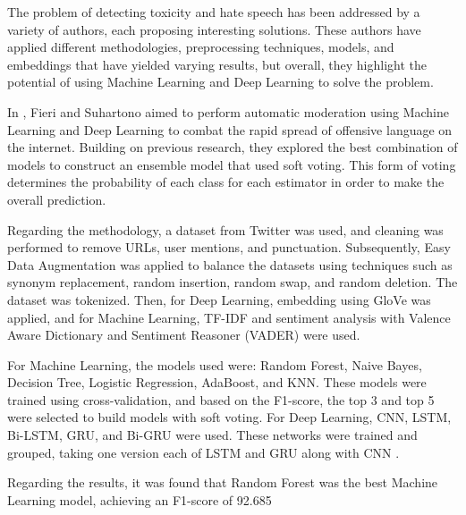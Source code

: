 
The problem of detecting toxicity and hate speech has been addressed by a variety of authors, each proposing interesting solutions. These authors have applied different methodologies, preprocessing techniques, models, and embeddings that have yielded varying results, but overall, they highlight the potential of using Machine Learning and Deep Learning to solve the problem.

In \cite{fieri2023offensive}, Fieri and Suhartono aimed to perform automatic moderation using Machine Learning and Deep Learning to combat the rapid spread of offensive language on the internet. Building on previous research, they explored the best combination of models to construct an ensemble model that used soft voting. This form of voting determines the probability of each class for each estimator in order to make the overall prediction.

Regarding the methodology, a dataset from Twitter was used, and cleaning was performed to remove URLs, user mentions, and punctuation. Subsequently, Easy Data Augmentation was applied to balance the datasets using techniques such as synonym replacement, random insertion, random swap, and random deletion. The dataset was tokenized. Then, for Deep Learning, embedding using GloVe was applied, and for Machine Learning, TF-IDF and sentiment analysis with Valence Aware Dictionary and Sentiment Reasoner (VADER) were used.

For Machine Learning, the models used were: Random Forest, Naive Bayes, Decision Tree, Logistic Regression, AdaBoost, and KNN. These models were trained using cross-validation, and based on the F1-score, the top 3 and top 5 were selected to build models with soft voting. For Deep Learning, CNN, LSTM, Bi-LSTM, GRU, and Bi-GRU were used. These networks were trained and grouped, taking one version each of LSTM and GRU along with CNN \cite{fieri2023offensive}.

Regarding the results, it was found that Random Forest was the best Machine Learning model, achieving an F1-score of 92.685%

